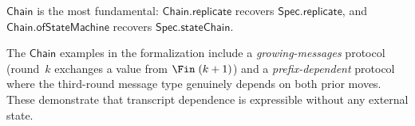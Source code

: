 $\mathsf{Chain}$ is the most fundamental: $\mathsf{Chain.replicate}$ recovers
$\mathsf{Spec.replicate}$, and $\mathsf{Chain.ofStateMachine}$ recovers
$\mathsf{Spec.stateChain}$.

\begin{remark}
  The $\mathsf{Chain}$ examples in the formalization include a
  \emph{growing-messages} protocol (round~$k$ exchanges a value from
  $\Fin\;(k+1)$) and a \emph{prefix-dependent} protocol where the third-round
  message type genuinely depends on both prior moves.  These demonstrate that
  transcript dependence is expressible without any external state.
\end{remark}
